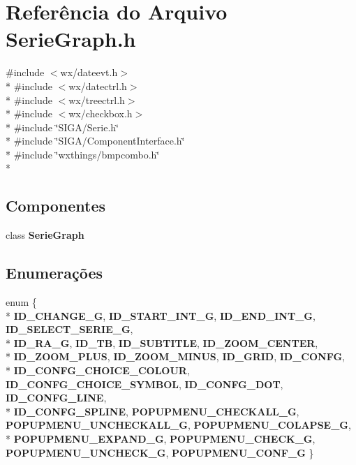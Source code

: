 \section{Referência do Arquivo Serie\+Graph.\+h}
\label{_serie_graph_8h}
{\ttfamily \#include $<$wx/dateevt.\+h$>$}\\*
{\ttfamily \#include $<$wx/datectrl.\+h$>$}\\*
{\ttfamily \#include $<$wx/treectrl.\+h$>$}\\*
{\ttfamily \#include $<$wx/checkbox.\+h$>$}\\*
{\ttfamily \#include \char`\"{}S\+I\+G\+A/\+Serie.\+h\char`\"{}}\\*
{\ttfamily \#include \char`\"{}S\+I\+G\+A/\+Component\+Interface.\+h\char`\"{}}\\*
{\ttfamily \#include \char`\"{}wxthings/bmpcombo.\+h\char`\"{}}\\*
\subsection*{Componentes}
\begin{DoxyCompactItemize}
\item 
class {\bf Serie\+Graph}
\end{DoxyCompactItemize}
\subsection*{Enumerações}
\begin{DoxyCompactItemize}
\item 
enum \{ \\*
{\bf I\+D\+\_\+\+C\+H\+A\+N\+G\+E\+\_\+G}, 
{\bf I\+D\+\_\+\+S\+T\+A\+R\+T\+\_\+\+I\+N\+T\+\_\+G}, 
{\bf I\+D\+\_\+\+E\+N\+D\+\_\+\+I\+N\+T\+\_\+G}, 
{\bf I\+D\+\_\+\+S\+E\+L\+E\+C\+T\+\_\+\+S\+E\+R\+I\+E\+\_\+G}, 
\\*
{\bf I\+D\+\_\+\+R\+A\+\_\+G}, 
{\bf I\+D\+\_\+\+TB}, 
{\bf I\+D\+\_\+\+S\+U\+B\+T\+I\+T\+LE}, 
{\bf I\+D\+\_\+\+Z\+O\+O\+M\+\_\+\+C\+E\+N\+T\+ER}, 
\\*
{\bf I\+D\+\_\+\+Z\+O\+O\+M\+\_\+\+P\+L\+US}, 
{\bf I\+D\+\_\+\+Z\+O\+O\+M\+\_\+\+M\+I\+N\+US}, 
{\bf I\+D\+\_\+\+G\+R\+ID}, 
{\bf I\+D\+\_\+\+C\+O\+N\+FG}, 
\\*
{\bf I\+D\+\_\+\+C\+O\+N\+F\+G\+\_\+\+C\+H\+O\+I\+C\+E\+\_\+\+C\+O\+L\+O\+UR}, 
{\bf I\+D\+\_\+\+C\+O\+N\+F\+G\+\_\+\+C\+H\+O\+I\+C\+E\+\_\+\+S\+Y\+M\+B\+OL}, 
{\bf I\+D\+\_\+\+C\+O\+N\+F\+G\+\_\+\+D\+OT}, 
{\bf I\+D\+\_\+\+C\+O\+N\+F\+G\+\_\+\+L\+I\+NE}, 
\\*
{\bf I\+D\+\_\+\+C\+O\+N\+F\+G\+\_\+\+S\+P\+L\+I\+NE}, 
{\bf P\+O\+P\+U\+P\+M\+E\+N\+U\+\_\+\+C\+H\+E\+C\+K\+A\+L\+L\+\_\+G}, 
{\bf P\+O\+P\+U\+P\+M\+E\+N\+U\+\_\+\+U\+N\+C\+H\+E\+C\+K\+A\+L\+L\+\_\+G}, 
{\bf P\+O\+P\+U\+P\+M\+E\+N\+U\+\_\+\+C\+O\+L\+A\+P\+S\+E\+\_\+G}, 
\\*
{\bf P\+O\+P\+U\+P\+M\+E\+N\+U\+\_\+\+E\+X\+P\+A\+N\+D\+\_\+G}, 
{\bf P\+O\+P\+U\+P\+M\+E\+N\+U\+\_\+\+C\+H\+E\+C\+K\+\_\+G}, 
{\bf P\+O\+P\+U\+P\+M\+E\+N\+U\+\_\+\+U\+N\+C\+H\+E\+C\+K\+\_\+G}, 
{\bf P\+O\+P\+U\+P\+M\+E\+N\+U\+\_\+\+C\+O\+N\+F\+\_\+G}
 \}
\end{DoxyCompactItemize}
